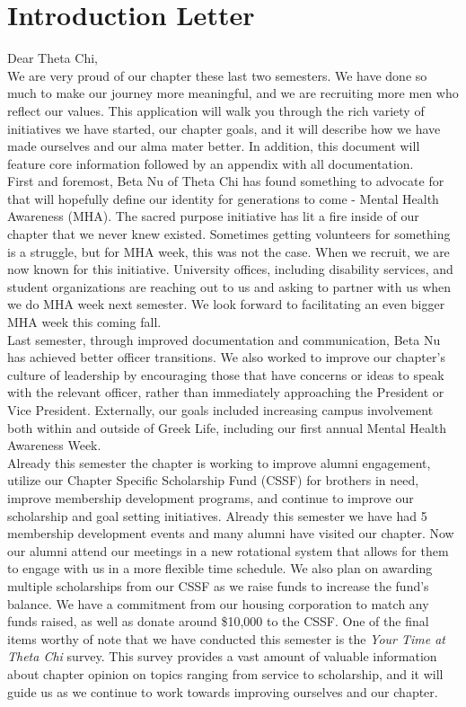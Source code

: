 \chapter{Introduction Letter}

Dear Theta Chi, \\

We are very proud of our chapter these last two semesters. We have done so much to make our journey more meaningful, and we are recruiting more men who reflect our values. This application will walk you through the rich variety of initiatives we have started, our chapter goals, and it will describe how we have made ourselves and our alma mater better. In addition, this document will feature core information followed by an appendix with all documentation. \\

First and foremost, Beta Nu of Theta Chi has found something to advocate for that will hopefully define our identity for generations to come - Mental Health Awareness (MHA). The sacred purpose initiative has lit a fire inside of our chapter that we never knew existed. Sometimes getting volunteers for something is a struggle, but for MHA week, this was not the case. When we recruit, we are now known for this initiative. University offices, including disability services, and student organizations are reaching out to us and asking to partner with us when we do MHA week next semester. We look forward to facilitating an even bigger MHA week this coming fall. \\

Last semester, through improved documentation and communication, Beta Nu has achieved better officer transitions. We also worked to improve our chapter’s culture of leadership by encouraging those that have concerns or ideas to speak with the relevant officer, rather than immediately approaching the President or Vice President.  Externally, our goals included increasing campus involvement both within and outside of Greek Life, including our first annual Mental Health Awareness Week.  \\

Already this semester the chapter is working to improve alumni engagement, utilize our Chapter Specific Scholarship Fund (CSSF) for brothers in need, improve membership development programs, and continue to improve our scholarship and goal setting initiatives. Already this semester we have had 5 membership development events and many alumni have visited our chapter. Now our alumni attend our meetings in a new rotational system that allows for them to engage with us in a more flexible time schedule. We also plan on awarding multiple scholarships from our CSSF as we raise funds to increase the fund's balance. We have a commitment from our housing corporation to match any funds raised, as well as donate around \$10,000 to the CSSF. One of the final items worthy of note that we have conducted this semester is the \textit{Your Time at Theta Chi} survey. This survey provides a vast amount of valuable information about chapter opinion on topics ranging from service to scholarship, and it will guide us as we continue to work towards improving ourselves and our chapter. \\

